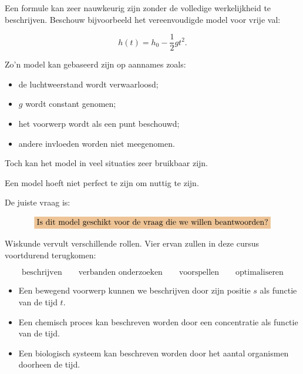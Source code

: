 \documentclass{ximera}
\begin{document}

Een formule kan zeer nauwkeurig zijn zonder de volledige werkelijkheid
te beschrijven. Beschouw bijvoorbeeld het vereenvoudigde model voor vrije val:

\[
h(t)=h_0-\frac12gt^2.
\]

Zo'n model kan gebaseerd zijn op aannames zoals:

\begin{itemize}
  \item de luchtweerstand wordt verwaarloosd;
  \item $g$ wordt constant genomen;
  \item het voorwerp wordt als een punt beschouwd;
  \item andere invloeden worden niet meegenomen.
\end{itemize}

Toch kan het model in veel situaties zeer bruikbaar zijn.

\begin{opmerking}
Een model hoeft niet perfect te zijn om nuttig te zijn.

De juiste vraag is:

\[
\important{
\text{Is dit model geschikt voor de vraag die we willen beantwoorden?}
}
\]
\end{opmerking}





Wiskunde vervult verschillende rollen. Vier ervan zullen in deze cursus voortdurend terugkomen:

\[
\boxed{
\text{beschrijven}
\qquad
\text{verbanden onderzoeken}
\qquad
\text{voorspellen}
\qquad
\text{optimaliseren}
}
\]



\begin{itemize}
  \item Een bewegend voorwerp kunnen we beschrijven door zijn positie $s$ als
  functie van de tijd $t$.
  \item Een chemisch proces kan beschreven worden door een concentratie als
  functie van de tijd.
  \item Een biologisch systeem kan beschreven worden door het aantal organismen
  doorheen de tijd.
\end{itemize}
\end{document}
